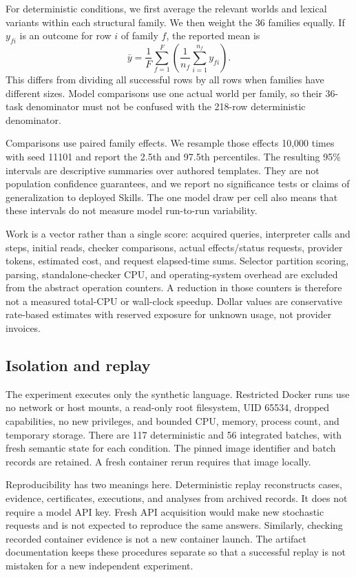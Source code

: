 \documentclass[conference]{IEEEtran}
\begin{document}
For deterministic conditions, we first average the relevant worlds and lexical variants within each structural family. We then weight the 36 families equally. If $y_{fi}$ is an outcome for row $i$ of family $f$, the reported mean is
\begin{equation}
\bar y=\frac{1}{F}\sum_{f=1}^{F}\left(\frac{1}{n_f}\sum_{i=1}^{n_f}y_{fi}\right).
\end{equation}
This differs from dividing all successful rows by all rows when families have different sizes. Model comparisons use one actual world per family, so their 36-task denominator must not be confused with the 218-row deterministic denominator.

Comparisons use paired family effects. We resample those effects 10,000 times with seed 11101 and report the 2.5th and 97.5th percentiles. The resulting 95\% intervals are descriptive summaries over authored templates. They are not population confidence guarantees, and we report no significance tests or claims of generalization to deployed Skills. The one model draw per cell also means that these intervals do not measure model run-to-run variability.

Work is a vector rather than a single score: acquired queries, interpreter calls and steps, initial reads, checker comparisons, actual effects/status requests, provider tokens, estimated cost, and request elapsed-time sums. Selector partition scoring, parsing, standalone-checker CPU, and operating-system overhead are excluded from the abstract operation counters. A reduction in those counters is therefore not a measured total-CPU or wall-clock speedup. Dollar values are conservative rate-based estimates with reserved exposure for unknown usage, not provider invoices.

\subsection{Isolation and replay}
The experiment executes only the synthetic language. Restricted Docker runs use no network or host mounts, a read-only root filesystem, UID 65534, dropped capabilities, no new privileges, and bounded CPU, memory, process count, and temporary storage. There are 117 deterministic and 56 integrated batches, with fresh semantic state for each condition. The pinned image identifier and batch records are retained. A fresh container rerun requires that image locally.

Reproducibility has two meanings here. Deterministic replay reconstructs cases, evidence, certificates, executions, and analyses from archived records. It does not require a model API key. Fresh API acquisition would make new stochastic requests and is not expected to reproduce the same answers. Similarly, checking recorded container evidence is not a new container launch. The artifact documentation keeps these procedures separate so that a successful replay is not mistaken for a new independent experiment.
\end{document}
